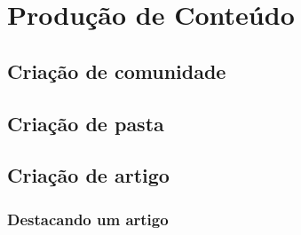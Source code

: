 \chapter{Produção de Conteúdo}
\label{chap:producaoConteudo}

\section{Criação de comunidade}

\section{Criação de pasta}

\section{Criação de artigo}
\subsection{Destacando um artigo}
